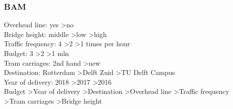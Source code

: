 \documentclass{article}
\begin{document}
\subsubsection{BAM}
Overhead line: yes \textgreater no \\
Bridge height: middle \textgreater low \textgreater high \\
Traffic frequency: 4 \textgreater 2 \textgreater 1 times per hour \\
Budget: 3 \textgreater 2 \textgreater 1 mln \\
Tram carriages: 2nd hand \textgreater new \\
Destination: Rotterdam \textgreater Delft Zuid \textgreater TU Delft Campus \\
Year of delivery: 2018 \textgreater 2017 \textgreater 2016 \\

Budget \textgreater Year of delivery \textgreater Destination \textgreater Overhead line \textgreater Traffic frequency \textgreater Tram carriages \textgreater Bridge height\\
\end{document}
